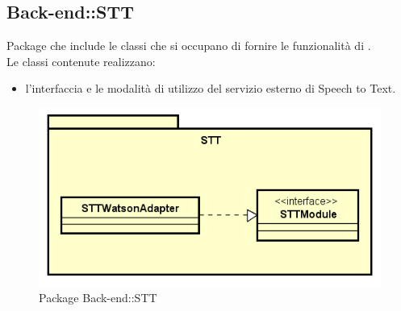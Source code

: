 \subsection{Back-end::STT}
Package che include le classi che si occupano di fornire le funzionalità di .\\ Le classi contenute realizzano: \begin{itemize} \item l'interfaccia e le modalità di utilizzo del servizio esterno di Speech to Text. \end{itemize}
\begin{figure}[h] \centering \includegraphics[width=\textwidth,height=\textheight,keepaspectratio]{images/diagrams/back-end/Official_Backend_0304/STT.png}
	\caption{Package Back-end::STT}
\end{figure}
\newpage

